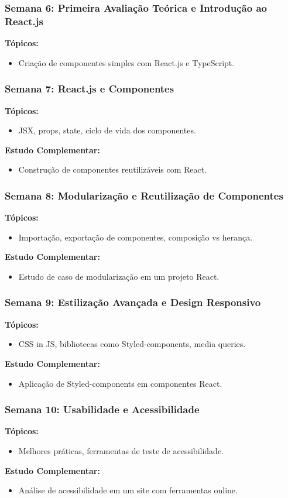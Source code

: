 \begin{frame}[fragile]
  \frametitle{Semana 6: Primeira Avaliação Teórica e Introdução ao React.js}
  \textbf{Tópicos:}
  \begin{itemize}
    \item Criação de componentes simples com React.js e TypeScript.
  \end{itemize}
\end{frame}

\begin{frame}[fragile]
  \frametitle{Semana 7: React.js e Componentes}
  \textbf{Tópicos:}
  \begin{itemize}
    \item JSX, props, state, ciclo de vida dos componentes.
  \end{itemize}
  \textbf{Estudo Complementar:}
  \begin{itemize}
    \item Construção de componentes reutilizáveis com React.
  \end{itemize}
\end{frame}

\begin{frame}[fragile]
  \frametitle{Semana 8: Modularização e Reutilização de Componentes}
  \textbf{Tópicos:}
  \begin{itemize}
    \item Importação, exportação de componentes, composição vs herança.
  \end{itemize}
  \textbf{Estudo Complementar:}
  \begin{itemize}
    \item Estudo de caso de modularização em um projeto React.
  \end{itemize}
\end{frame}

\begin{frame}[fragile]
  \frametitle{Semana 9: Estilização Avançada e Design Responsivo}
  \textbf{Tópicos:}
  \begin{itemize}
    \item CSS in JS, bibliotecas como Styled-components, media queries.
  \end{itemize}
  \textbf{Estudo Complementar:}
  \begin{itemize}
    \item Aplicação de Styled-components em componentes React.
  \end{itemize}
\end{frame}

\begin{frame}[fragile]
  \frametitle{Semana 10: Usabilidade e Acessibilidade}
  \textbf{Tópicos:}
  \begin{itemize}
    \item Melhores práticas, ferramentas de teste de acessibilidade.
  \end{itemize}
  \textbf{Estudo Complementar:}
  \begin{itemize}
    \item Análise de acessibilidade em um site com ferramentas online.
  \end{itemize}
\end{frame}

